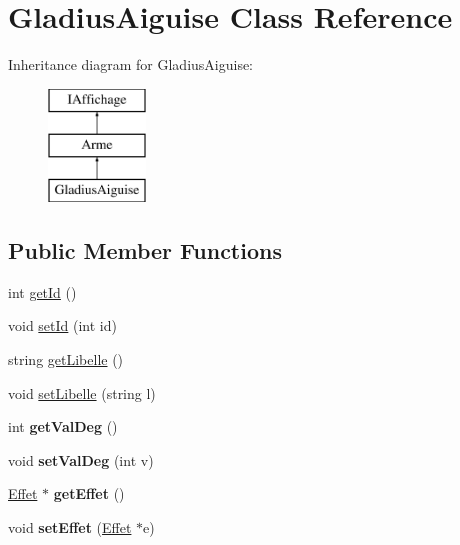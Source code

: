 \hypertarget{class_gladius_aiguise}{\section{\-Gladius\-Aiguise \-Class \-Reference}
\label{class_gladius_aiguise}
}
\-Inheritance diagram for \-Gladius\-Aiguise\-:\begin{figure}[H]
\begin{center}
\leavevmode
\includegraphics[height=3.000000cm]{class_gladius_aiguise}
\end{center}
\end{figure}
\subsection*{\-Public \-Member \-Functions}
\begin{DoxyCompactItemize}
\item 
int \hyperlink{class_gladius_aiguise_a9f54b9a3f9bc8bbb252dd9cc78d481d1}{get\-Id} ()
\item 
void \hyperlink{class_gladius_aiguise_a32d93fce577bca09338829bcd8544674}{set\-Id} (int id)
\item 
string \hyperlink{class_gladius_aiguise_afc73b6fd6b318112e11e6287fdbe9cff}{get\-Libelle} ()
\item 
void \hyperlink{class_gladius_aiguise_a36a9d4d8f0b92534ea50c1189be14d85}{set\-Libelle} (string l)
\item 
\hypertarget{class_gladius_aiguise_a209e41b8256153d8bef8b49a4722c4c7}{int {\bfseries get\-Val\-Deg} ()}\label{class_gladius_aiguise_a209e41b8256153d8bef8b49a4722c4c7}

\item 
\hypertarget{class_gladius_aiguise_a33bd11dcd1734857cbeec73f6642f348}{void {\bfseries set\-Val\-Deg} (int v)}\label{class_gladius_aiguise_a33bd11dcd1734857cbeec73f6642f348}

\item 
\hypertarget{class_gladius_aiguise_a01d53f6ce5a3cb94c3a4db7048454b0b}{\hyperlink{class_effet}{\-Effet} $\ast$ {\bfseries get\-Effet} ()}\label{class_gladius_aiguise_a01d53f6ce5a3cb94c3a4db7048454b0b}

\item 
\hypertarget{class_gladius_aiguise_acc1aaf2008a3cbf36ae277a055b549dd}{void {\bfseries set\-Effet} (\hyperlink{class_effet}{\-Effet} $\ast$e)}\label{class_gladius_aiguise_acc1aaf2008a3cbf36ae277a055b549dd}

\end{DoxyCompactItemize}


